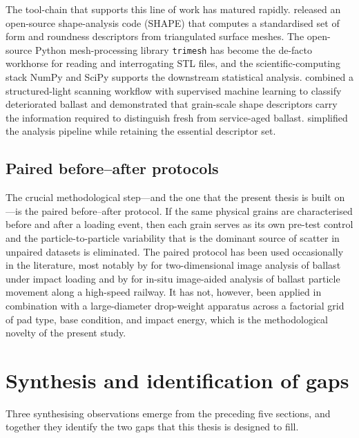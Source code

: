 The tool-chain that supports this line of work has matured rapidly.
\citet{Angelidakis2021} released an open-source shape-analysis code
(SHAPE) that computes a standardised set of form and roundness descriptors
from triangulated surface meshes. The open-source Python mesh-processing
library \texttt{trimesh} \citep{DawsonHaggerty2019} has become the
de-facto workhorse for reading and interrogating \gls{STL} files, and the
scientific-computing stack NumPy \citep{Harris2020} and SciPy
\citep{Virtanen2020} supports the downstream statistical analysis.
\citet{Kwunjai2023} combined a structured-light scanning workflow with
supervised machine learning to classify deteriorated ballast and
demonstrated that grain-scale shape descriptors carry the information
required to distinguish fresh from service-aged ballast.
\citet{Kwunjai2024} simplified the analysis pipeline while retaining the
essential descriptor set.

\subsection{Paired before--after protocols}
\label{sec:lit-paired}

The crucial methodological step---and the one that the present thesis is
built on---is the paired before--after protocol. If the same physical
grains are characterised before and after a loading event, then each
grain serves as its own pre-test control and the particle-to-particle
variability that is the dominant source of scatter in unpaired datasets is
eliminated. The paired protocol has been used occasionally in the
literature, most notably by \citet{Ferreira2023} for two-dimensional image
analysis of ballast under impact loading and by \citet{Bian2023} for
in-situ image-aided analysis of ballast particle movement along a
high-speed railway. It has not, however, been applied in combination with
a large-diameter drop-weight apparatus across a factorial grid of pad
type, base condition, and impact energy, which is the methodological
novelty of the present study.

\section{Synthesis and identification of gaps}
\label{sec:lit-synthesis}

Three synthesising observations emerge from the preceding five sections,
and together they identify the two gaps that this thesis is designed to
fill.

